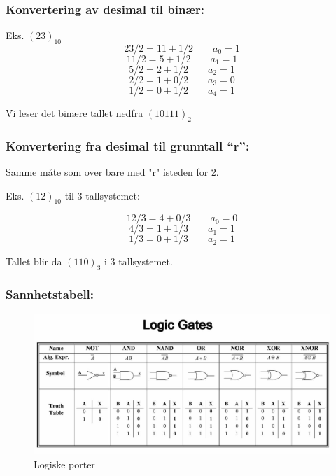 \documentclass{article}
\begin{document}
	
	
	\subsubsection{Konvertering av desimal til binær:}
	
	Eks. $(23)_{10}$
	$$ 23/2 = 11 + 1/2 \qquad a_0 = 1 $$
	$$ 11/2 = 5 + 1/2 \qquad a_1 = 1 $$
	$$ 5/2 = 2 + 1/2 \qquad a_2 = 1 $$	
	$$ 2/2 = 1 + 0/2 \qquad a_3 = 0 
	$$
	$$1/2 = 0 + 1/2 \qquad a_4 = 1
	$$
	
	Vi leser det binære tallet nedfra $(10111)_{2}$
	
	
	\subsubsection{Konvertering fra desimal til grunntall “r”:}
	Samme måte som over bare med "r" isteden for 2.
	
	Eks. $(12)_{10}$ til 3-tallsystemet:
	
	$$ 12/3 = 4 + 0/3 \qquad a_0 = 0$$
	$$ 4/3 = 1 + 1/3 \qquad a_1 = 1$$
	$$ 1/3 = 0 + 1/3 \qquad a_2 = 1 $$
	
	Tallet blir da $(110)_3$ i 3 tallsystemet.
	
	\subsubsection{Sannhetstabell:}
		
	\begin{figure}[H]
		\includegraphics[scale=0.35]{GATES.jpg}
		\caption{Logiske porter}
	\end{figure}
	
\end{document}
